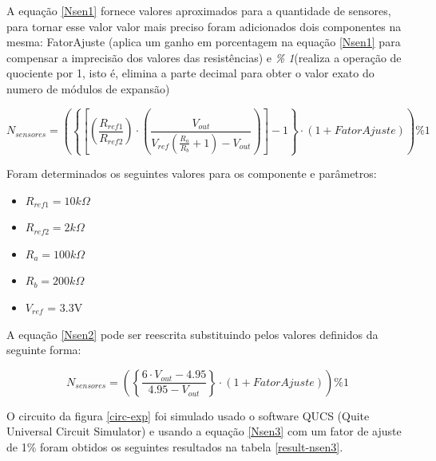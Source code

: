 A equação \ref{Nsen1} fornece valores aproximados para a quantidade de sensores, para tornar esse valor valor mais preciso foram adicionados dois componentes na mesma: FatorAjuste (aplica um ganho em porcentagem na equação \ref{Nsen1} para compensar a imprecisão dos valores das resistências) e \textit{\% 1}(realiza a operação de quociente por 1, isto é, elimina a parte decimal para obter o valor exato do numero de módulos de expansão)

\begin{equation}\label{Nsen2}
N_{sensores} =
\left(
    \left\lbrace
        \left[
            \left( \frac{ R_{ref1} }{ R_{ref2} } \right)
            \cdot
            \left( \frac{V_{out}}{ V_{ref} \left(
                \frac{ R_{a} }{ R_{b} } + 1
            \right)
             - V_{out}} \right)
        \right] - 1
    \right\rbrace \cdot \left( 1 + FatorAjuste \right)
\right) \% 1
\end{equation}

Foram determinados os seguintes valores para os componente e parâmetros:
\begin{itemize}
    \item $R_{ref1} = 10k\Omega$
    \item $R_{ref2} = 2k\Omega$
    \item $R_{a} = 100k\Omega$
    \item $R_{b} = 200k\Omega$
    \item $V_{ref}$ = 3.3V
\end{itemize}

A equação \ref{Nsen2} pode ser reescrita substituindo pelos valores definidos da seguinte forma:

\begin{equation}\label{Nsen3}
N_{sensores} =
\left(
    \left\lbrace
            \frac{ 6 \cdot V_{out} - 4.95 }{4.95
             - V_{out}}
    \right\rbrace \cdot \left( 1 + FatorAjuste \right)
\right) \% 1
\end{equation}

O circuito da figura \ref{circ-exp} foi simulado usado o software QUCS (Quite Universal Circuit Simulator) e usando a equação \ref{Nsen3} com um fator de ajuste de 1$\%$ foram obtidos os seguintes resultados na tabela \ref{result-nsen3}.

